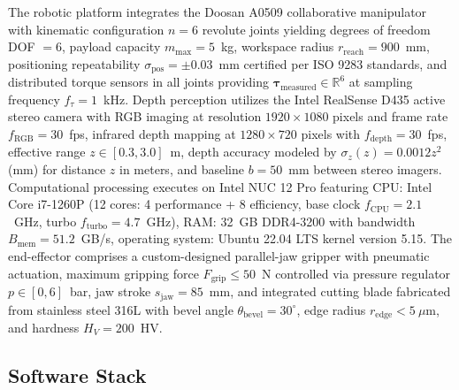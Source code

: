 \documentclass[journal]{IEEEtran}
\begin{document}
The robotic platform integrates the Doosan A0509 collaborative manipulator with kinematic configuration $n = 6$ revolute joints yielding degrees of freedom DOF $= 6$, payload capacity $m_{\text{max}} = 5$~kg, workspace radius $r_{\text{reach}} = 900$~mm, positioning repeatability $\sigma_{\text{pos}} = \pm 0.03$~mm certified per ISO 9283 standards, and distributed torque sensors in all joints providing $\boldsymbol{\tau}_{\text{measured}} \in \mathbb{R}^6$ at sampling frequency $f_\tau = 1$~kHz. Depth perception utilizes the Intel RealSense D435 active stereo camera with RGB imaging at resolution $1920 \times 1080$ pixels and frame rate $f_{\text{RGB}} = 30$~fps, infrared depth mapping at $1280 \times 720$ pixels with $f_{\text{depth}} = 30$~fps, effective range $z \in [0.3, 3.0]$~m, depth accuracy modeled by $\sigma_z(z) = 0.0012 z^2$ (mm) for distance $z$ in meters, and baseline $b = 50$~mm between stereo imagers. Computational processing executes on Intel NUC 12 Pro featuring CPU: Intel Core i7-1260P (12 cores: 4 performance + 8 efficiency, base clock $f_{\text{CPU}} = 2.1$~GHz, turbo $f_{\text{turbo}} = 4.7$~GHz), RAM: 32~GB DDR4-3200 with bandwidth $B_{\text{mem}} = 51.2$~GB/s, operating system: Ubuntu 22.04 LTS kernel version 5.15. The end-effector comprises a custom-designed parallel-jaw gripper with pneumatic actuation, maximum gripping force $F_{\text{grip}} \leq 50$~N controlled via pressure regulator $p \in [0, 6]$~bar, jaw stroke $s_{\text{jaw}} = 85$~mm, and integrated cutting blade fabricated from stainless steel 316L with bevel angle $\theta_{\text{bevel}} = 30^\circ$, edge radius $r_{\text{edge}} < 5~\mu$m, and hardness $H_V = 200$~HV.

\subsection{Software Stack}
\end{document}
